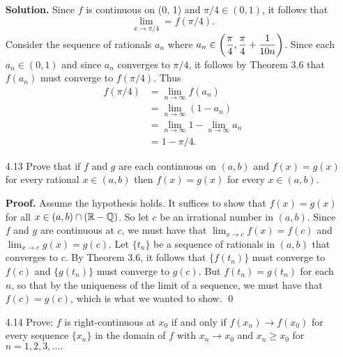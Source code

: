 \begin{enumerate}
      \textbf{Solution.} Since $f$ is continuous on (0, 1) and
      $\pi/4 \in (0, 1)$, it follows that
      $$\lim_{x \rightarrow \pi/4} = f(\pi/4).$$
      Consider the sequence of rationals $a_n$ where
      $\displaystyle a_n \in \left(\frac{\pi}{4}, \frac{\pi}{4} + \frac{1}{10n}\right)$.
      Since each $a_n \in (0, 1)$ and since $a_n$ converges to $\pi/4$, it 
      follows by Theorem 3.6 that $f(a_n)$ must converge to $f(\pi/4)$. Thus
      \begin{align*}
         f(\pi/4) &= \lim_{n\rightarrow\infty}f(a_n) \\
            &= \lim_{n\rightarrow\infty}(1 - a_n) \\
            &= \lim_{n\rightarrow\infty}1 - \lim_{n\rightarrow\infty}a_n \\
            &= 1 - \pi/4.
      \end{align*}
   \item[4.13] Prove that if $f$ and $g$ are each continuous on $(a, b)$ and
               $f(x) = g(x)$ for every rational $x \in (a, b)$ then
               $f(x) = g(x)$ for every $x \in (a, b)$.

      \textbf{Proof.} Assume the hypothesis holds. It suffices to show that
      $f(x) = g(x)$ for all $x \in (a, b) \cap (\mathbb{R} - \mathbb{Q})$. So let $c$ be an
      irrational number in $(a, b)$. Since $f$ and $g$ are continuous at $c$, we 
      must have that $\lim_{x\rightarrow c}f(x) = f(c)$ and
      $\lim_{x\rightarrow c}g(x) = g(c)$. Let $\{t_n\}$ be a sequence of 
      rationals in $(a, b)$ that converges to $c$. By Theorem 3.6, it follows 
      that $\{f(t_n)\}$ must converge to $f(c)$ and $\{g(t_n)\}$ must converge 
      to $g(c)$. But $f(t_n) = g(t_n)$ for each $n$, so that by the uniqueness 
      of the limit of a sequence, we must have that $f(c) = g(c)$, which is what 
      we wanted to show. \qed
   \item[4.14] Prove: $f$ is right-continuous at $x_0$ if and only if
               $f(x_n) \rightarrow f(x_0)$ for every sequence $\{x_n\}$ in the
               domain of $f$ with $x_n \rightarrow x_0$ and $x_n \ge x_0$ for
               $n = 1, 2, 3, ....$


\end{enumerate}
